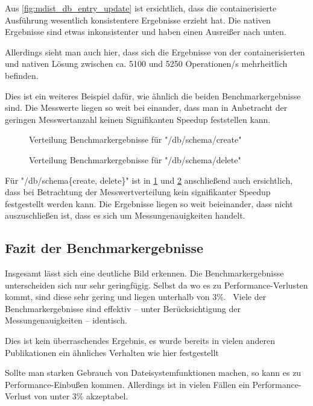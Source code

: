 \FloatBarrier

Aus \cref{fig:mdist_db_entry_update} ist ersichtlich, dass die containerisierte Ausführung wesentlich konsistentere Ergebnisse erzieht hat. 
Die nativen Ergebnisse sind etwas inkonsistenter und haben einen Ausreißer nach unten. 

Allerdings sieht man auch hier, dass sich die Ergebnisse von der containerisierten und nativen Lösung zwischen ca. 5100 und 5250 Operationen/s mehrheitlich befinden. 

Dies ist ein weiteres Beispiel dafür, wie ähnlich die beiden Benchmarkergebnisse sind. Die Messwerte liegen so weit bei einander, dass man in Anbetracht der geringen Messwertanzahl keinen Signifikanten Speedup feststellen kann.

\begin{figure}[H]
    \centering
    
    \caption{Verteilung Benchmarkergebnisse für "/db/schema/create"}
    \label{fig:mdist_db_schema_create}
\end{figure}

\begin{figure}[H]
    \centering
    
    \caption{Verteilung Benchmarkergebnisse für "/db/schema/delete"}
    \label{fig:mdist_db_schema_delete}
\end{figure}

Für "/db/schema\{create, delete\}" ist in \cref{fig:mdist_db_schema_create} und \cref{fig:mdist_db_schema_delete} anschließend auch ersichtlich, dass bei Betrachtung der Messwertverteilung kein signifikanter Speedup festgestellt werden kann. Die Ergebnisse liegen so weit beieinander, dass nicht auszuschließen ist, dass es sich um Messungenauigkeiten handelt.

\FloatBarrier

\subsection{Fazit der Benchmarkergebnisse}

Insgesamt lässt sich eine deutliche Bild erkennen. Die Benchmarkergebnisse unterscheiden sich nur sehr geringfügig. Selbst da wo es zu Performance-Verlusten kommt, sind diese sehr gering und liegen unterhalb von $3\%$. \
Viele der Benchmarkergebnisse sind effektiv – unter Berücksichtigung der Messungenauigkeiten – identisch.

Dies ist kein überraschendes Ergebnis, es wurde bereits in vielen anderen Publikationen ein ähnliches Verhalten wie hier festgestellt \cite[Vgl. S. 2589ff]{huExploringPerformanceSingularity2019}

Sollte man starken Gebrauch von Dateisystemfunktionen machen, so kann es zu Performance-Einbußen kommen. Allerdings ist in vielen Fällen ein Performance-Verlust von unter $3\%$ akzeptabel. 